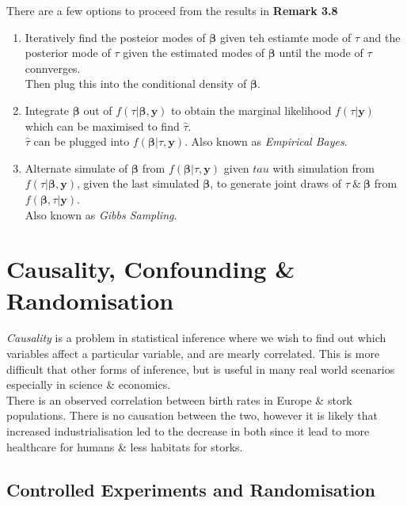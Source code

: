 \documentclass[11pt,a4paper]{article}
\begin{document}
There are a few options to proceed from the results in \textbf{Remark 3.8}
\begin{enumerate}
	\item Iteratively find the posteior modes of $\pmb\beta$ given teh estiamte mode of $\tau$ and the posterior mode of $\tau$ given the estimated modes of $\pmb\beta$ until the mode of $\tau$ connverges.\\
	Then plug this into the conditional density of $\pmb\beta$.
	\item Integrate $\pmb\beta$ out of $f(\tau|\pmb\beta,\textbf{y})$ to obtain the marginal likelihood $f(\tau|\textbf{y})$ which can be maximised to find $\hat\tau$.\\
	$\hat\tau$ can be plugged into $f(\pmb\beta|\tau,\textbf{y})$.
	\nb Also known as \textit{Empirical Bayes}.
	\item Alternate simulate of $\pmb\beta$ from $f(\pmb\beta|\tau,\textbf{y})$ given $tau$ with simulation from $f(\tau|\pmb\beta,\textbf{y})$, given the last simulated $\pmb\beta$, to generate joint draws of $\tau\ \&\ \pmb\beta$ from $f(\pmb\beta,\tau|\textbf{y})$.\\
	\nb Also known as \textit{Gibbs Sampling}.
\end{enumerate}

\section{Causality, Confounding \& Randomisation}

\textit{Causality} is a problem in statistical inference where we wish to find out which variables affect a particular variable, and are mearly correlated. This is more difficult that other forms of inference, but is useful in many real world scenarios especially in science \& economics.\\

There is an observed correlation between birth rates in Europe \& stork populations. There is no causation between the two, however it is likely that increased industrialisation led to the decrease in both since it lead to more healthcare for humans \& less habitats for storks.\\

\subsection{Controlled Experiments and Randomisation}
\end{document}
